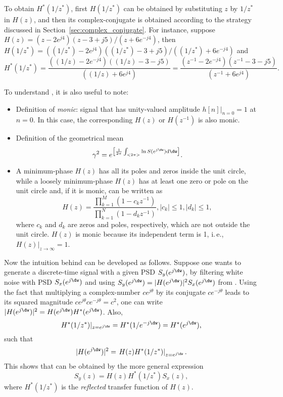 To obtain $H^*(1/z^*)$, first $H(1/z^*)$ can be obtained by substituting $z$ by $1/z^*$ in $H(z)$, and then its complex-conjugate is obtained according to the strategy discussed in Section~\ref{sec:complex_conjugate}. For instance, suppose $H(z) = (z-2e^{j4}) (z-3+j5) / (z+6e^{-j4})$, then		
	$H(1/z^*) = ((1/z^*)-2e^{j4}) ((1/z^*)-3+j5) / ((1/z^*)+6e^{-j4})$ and 
	\begin{equation}
	H^*(1/z^*) = \frac{((1/z)-2e^{-j4}) ((1/z)-3-j5)}{((1/z)+6e^{j4})} = \frac{(z^{-1}-2e^{-j4}) (z^{-1} -3-j5)}{(z^{-1} +6e^{j4})}.
	\label{eq:example_reflected_function}
	\end{equation}	

To understand , it is also useful to note:
\begin{itemize}
	\item Definition of \emph{monic}: signal that has unity-valued amplitude $h[n]|_{n=0}=1$ at $n=0$. In this case, the corresponding $H(z)$ or $H(z^{-1})$ is also monic.
	\item Definition of the geometrical mean
\[
\gamma^2 = e^{\left[\frac{1}{2\pi} \int_{<2 \pi>} \ln S(e^{j\dw}) \textrm{d}\dw \right]}.
\] 
	\item A minimum-phase $H(z)$ has all its poles and zeros inside the unit circle, while a loosely minimum-phase $H(z)$ has at least one zero or pole on the unit circle and, if it is monic, can be written as
	\begin{equation}
	H(z) = \frac{ \prod_{k=1}^M (1-c_k z^{-1})}{\prod_{k=1}^N (1-d_k  z^{-1})}, |c_k| \le 1, |d_k| \le 1,
	\label{eq:monic_rational_function}
	\end{equation}	
	where $c_k$ and $d_k$ are zeros and poles, respectively, which are not outside the unit circle.
	$H(z)$ is monic because its independent term is 1, i.\,e., $H(z)|_{z \rightarrow \infty} = 1$.
\end{itemize}

Now the intuition behind  can be developed as follows. Suppose one wants to generate a discrete-time signal with a given PSD $S_y(e^{j\dw})$, by filtering white noise with PSD $S_x(e^{j\dw})$ and 
using $S_y(e^{j\dw}) = |H(e^{j\dw})|^2 S_x(e^{j\dw})$ from . Using the fact that multiplying a complex-number $c e^{j \theta}$ by its conjugate $c e^{-j \theta}$ leads to its squared magnitude $c e^{j \theta} c e^{-j \theta} = c^2$, one can write $|H(e^{j\dw})|^2 = H(e^{j\dw}) H^*(e^{j\dw})$. Also,
\[
H^*(1/z^*)|_{z=e^{j\dw}} = H^*(1/e^{-j\dw}) = H^*(e^{j\dw}),
\]
such that 
\[
|H(e^{j\dw})|^2 = \left. H(z) H^*(1/z^*) \right|_{z=e^{j\dw}}.
\]
This shows that  can be obtained by the more general expression
\begin{equation}
S_y(z) = H(z) H^*(1/z^{*}) S_x(z),
\label{eq:discrete_filtered_wssInZDomain}
\end{equation}
where $H^*(1/z^{*})$ is the \emph{reflected} transfer function of $H(z)$. 

